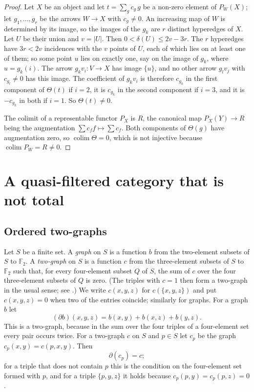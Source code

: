 \documentclass[11pt,a4paper]{article}
\theoremstyle{definition}
\newcommand{\colim}{\operatorname{colim}}
\newcommand{\F}{\mathbb{F}}
\begin{document}
\begin{proof}
Let $X$ be an object and let $t=\sum_g c_g\,g$ be a non-zero element of
$P_W(X)$; let $g_1,\dots,g_r$ be the arrows $W\to X$ with $c_g\ne 0$. An
increasing map of $W$ is determined by its image, so the images of the $g_k$
are $r$ distinct hyperedges of $X$. Let $U$ be their union and $v=|U|$. Then
$0<\delta(U)\le 2v-3r$. The $r$ hyperedges have $3r<2v$ incidences with the $v$
points of $U$, each of which lies on at least one of them; so some point $u$
lies on exactly one, say on the image of $g_k$, where $u=g_k(i)$. The arrow
$g_kv_i\colon V\to X$ has image $\{u\}$, and no other arrow $g_lv_j$ with
$c_{g_l}\ne 0$ has this image. The coefficient of $g_kv_i$ is therefore
$c_{g_k}$ in the first component of $\Theta(t)$ if $i=2$, it is $c_{g_k}$ in the
second component if $i=3$, and it is $-c_{g_k}$ in both if $i=1$. So
$\Theta(t)\ne 0$.

The colimit of a representable functor $P_X$ is $R$, the canonical map
$P_X(Y)\to R$ being the augmentation $\sum c_f f\mapsto\sum c_f$. Both
components of $\Theta(g)$ have augmentation zero, so $\colim\Theta=0$, which is
not injective because $\colim P_W=R\ne 0$.
\end{proof}
\section{A quasi-filtered category that is not total}\label{sec:twographs}

\subsection{Ordered two-graphs}

Let $S$ be a finite set. A \emph{graph} on $S$ is a function $b$ from the
two-element subsets of $S$ to $\F_2$. A \emph{two-graph} on $S$ is a function
$c$ from the three-element subsets of $S$ to $\F_2$ such that, for every
four-element subset $Q$ of $S$, the sum of $c$ over the four three-element
subsets of $Q$ is zero. (The triples with $c=1$ then form a two-graph in the
usual sense; see \cite{Seidel}.) We write $c(x,y,z)$ for $c(\{x,y,z\})$ and
put $c(x,y,z)=0$ when two of the entries coincide; similarly for graphs. For
a graph $b$ let
\[
 (\partial b)(x,y,z)=b(x,y)+b(x,z)+b(y,z).
\]
This is a two-graph, because in the sum over the four triples of a
four-element set every pair occurs twice. For a two-graph $c$ on $S$ and
$p\in S$ let $c_p$ be the graph $c_p(x,y)=c(p,x,y)$. Then
\begin{equation}\label{eq:anchor}
 \partial(c_p)=c ;
\end{equation}
for a triple that does not contain $p$ this is the condition on the
four-element set formed with $p$, and for a triple $\{p,y,z\}$ it holds because
$c_p(p,y)=c_p(p,z)=0$.
\end{document}

